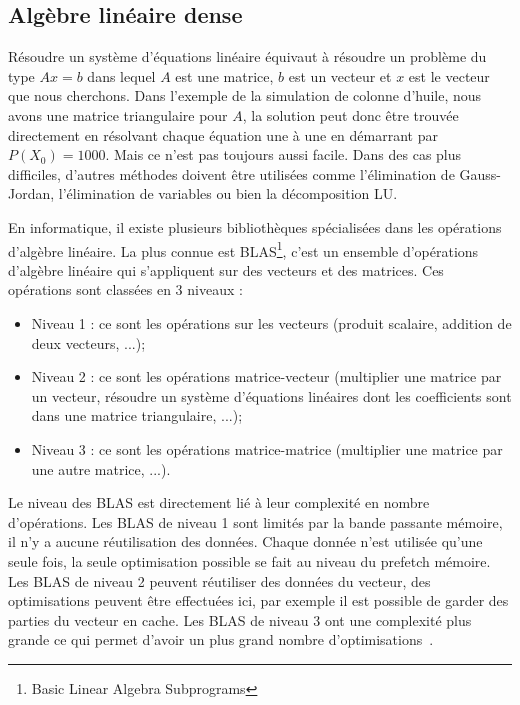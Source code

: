 \subsection{Algèbre linéaire dense}
Résoudre un système d'équations linéaire équivaut à résoudre un problème du type $Ax=b$ dans lequel $A$ est une matrice, $b$ est un vecteur et $x$ est le vecteur que nous cherchons.
%
Dans l'exemple de la simulation de colonne d'huile, nous avons une matrice triangulaire pour $A$, la solution peut donc être trouvée directement en résolvant chaque équation une à une en démarrant par $P(X_0) = 1000$.
%
Mais ce n'est pas toujours aussi facile.
%
Dans des cas plus difficiles, d'autres méthodes doivent être utilisées comme l'élimination de Gauss-Jordan, l'élimination de variables ou bien la décomposition LU.


En informatique, il existe plusieurs bibliothèques spécialisées dans les opérations d'algèbre linéaire.
%
La plus connue est BLAS\footnote{Basic Linear Algebra Subprograms}, c'est un ensemble d'opérations d'algèbre linéaire qui s'appliquent sur des vecteurs et des matrices.
%
Ces opérations sont classées en 3 niveaux :
\begin{itemize}
  \item Niveau 1 : ce sont les opérations sur les vecteurs (produit scalaire, addition de deux vecteurs, ...);
  \item Niveau 2 : ce sont les opérations matrice-vecteur (multiplier une matrice par un vecteur, résoudre un système d'équations linéaires dont les coefficients sont dans une matrice triangulaire, ...);
  \item Niveau 3 : ce sont les opérations matrice-matrice (multiplier une matrice par une autre matrice, ...).
\end{itemize}
%
Le niveau des BLAS est directement lié à leur complexité en nombre d'opérations.
%
Les BLAS de niveau 1 sont limités par la bande passante mémoire, il n'y a aucune réutilisation des données.
%
Chaque donnée n'est utilisée qu'une seule fois, la seule optimisation possible se fait au niveau du prefetch mémoire.
%
Les BLAS de niveau 2 peuvent réutiliser des données du vecteur, des optimisations peuvent être effectuées ici, par exemple il est possible de garder des parties du vecteur en cache.
%
Les BLAS de niveau 3 ont une complexité plus grande ce qui permet d'avoir un plus grand nombre d'optimisations~\cite{blas3_opt}.

